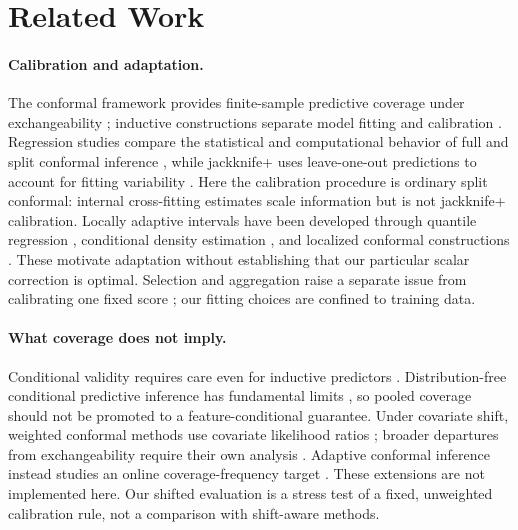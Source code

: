 \documentclass{article}
\begin{document}
\section{Related Work}
\paragraph{Calibration and adaptation.}
The conformal framework provides finite-sample predictive coverage under exchangeability \citep{Vovk2005}; inductive constructions separate model fitting and calibration \citep{Papadopoulos2002}. Regression studies compare the statistical and computational behavior of full and split conformal inference \citep{Lei2018}, while jackknife+ uses leave-one-out predictions to account for fitting variability \citep{Barber2021Jackknife}. Here the calibration procedure is ordinary split conformal: internal cross-fitting estimates scale information but is not jackknife+ calibration. Locally adaptive intervals have been developed through quantile regression \citep{Romano2019,Sesia2020}, conditional density estimation \citep{Lei2014,Izbicki2020}, and localized conformal constructions \citep{Guan2023}. These motivate adaptation without establishing that our particular scalar correction is optimal. Selection and aggregation raise a separate issue from calibrating one fixed score \citep{Yang2024}; our fitting choices are confined to training data.

\paragraph{What coverage does not imply.}
Conditional validity requires care even for inductive predictors \citep{Vovk2012}. Distribution-free conditional predictive inference has fundamental limits \citep{Barber2021Limits}, so pooled coverage should not be promoted to a feature-conditional guarantee. Under covariate shift, weighted conformal methods use covariate likelihood ratios \citep{Tibshirani2019}; broader departures from exchangeability require their own analysis \citep{Barber2023Beyond}. Adaptive conformal inference instead studies an online coverage-frequency target \citep{Gibbs2021}. These extensions are not implemented here. Our shifted evaluation is a stress test of a fixed, unweighted calibration rule, not a comparison with shift-aware methods.
\end{document}

